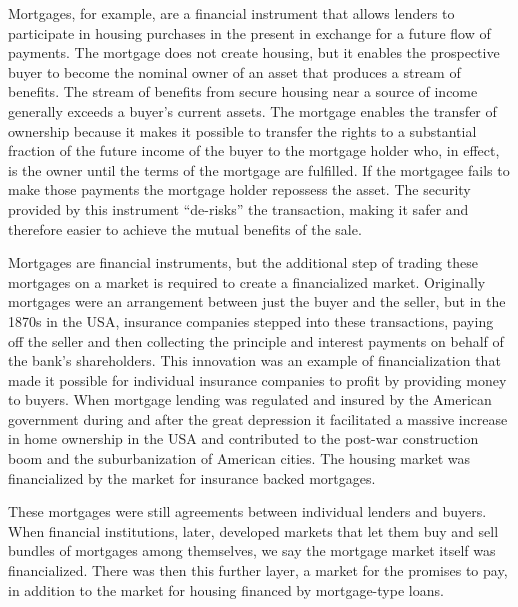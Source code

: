 Mortgages, for example, are a financial instrument that allows lenders to  participate in housing purchases in the present in exchange for a future flow of payments.  The mortgage does not create housing, but it enables the prospective buyer to become the nominal owner of an asset that produces a stream of benefits. The stream of benefits from secure housing near a source of income generally exceeds a buyer's current assets. The mortgage enables the transfer of ownership because it makes it possible to transfer the rights to a substantial fraction of the future income of the buyer to the mortgage holder who, in effect, is the owner until the terms of the mortgage are fulfilled.  If the mortgagee fails to make those payments the mortgage holder repossess the asset. The security provided by this instrument ``de-risks'' the transaction, making it safer and therefore easier to achieve the mutual benefits of the sale.

Mortgages are  financial instruments, but %
the additional step of trading these mortgages on a market is required to create a financialized market. 
Originally mortgages were an arrangement between just the buyer and the seller, but in the 1870s in the USA, insurance companies stepped into these transactions, paying off the seller and then collecting the principle and interest payments on behalf of the bank's shareholders. This innovation was an example of financialization that made it possible for individual insurance companies to profit by providing money to buyers. When mortgage lending was regulated and insured  by the American government during and after the great depression it facilitated a massive increase in home ownership in the USA and contributed to the post-war construction boom and the suburbanization of American cities. The housing market was financialized by the market for insurance backed mortgages.

These mortgages were still agreements between individual lenders and buyers. When financial institutions, later,  developed markets that let them buy and sell bundles of mortgages among themselves, we say the mortgage market itself was financialized. There was then this further layer, a market for the promises to pay, in addition to the market for housing financed by %
mortgage-type loans.

